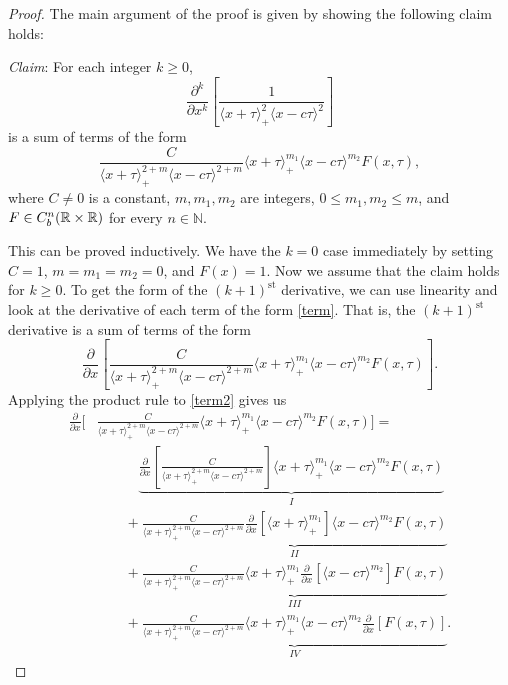 \cknormbound*
\begin{proof}
	The main argument of the proof is given by showing the following claim holds:
	
	\emph{Claim}: For each integer \(k\geq 0\), \[\frac{\partial^k}{\partial x^k} \left[\frac 1 {\langle x+\tau\rangle_+^2 \langle x -c\tau \rangle^2}\right]\] is a sum of terms of the form 
	\begin{equation}\label{term}
		\frac C {\langle x +\tau\rangle_+^{2+m} \langle x -c\tau \rangle^{2+m}}\langle x + \tau \rangle_+^{m_1}\langle x-c\tau\rangle^{m_2} F(x,\tau),
	\end{equation} where \(C\neq 0\) is a constant, \(m,m_1,m_2\) are integers, \(0\leq m_1, m_2 \leq m\), and \(F\in C^n_b(\mathbb{R}\times\mathbb{R})\) for every \(n\in \mathbb N\).
	
	This can be proved inductively. We have the \(k = 0\) case immediately by setting \(C = 1\), \(m=m_1=m_2 = 0\), and \(F(x) = 1\). Now we assume that the claim holds for \(k\geq 0\). To get the form of the \((k+1)^\text{st}\) derivative, we can use linearity and look at the derivative of each term of the form \cref{term}. That is, the \((k+1)^\text{st}\) derivative is a sum of terms of the form 
	\begin{equation}\label{term2}
		\frac{\partial}{\partial x}\left[\frac C {\langle x +\tau\rangle_+^{2+m} \langle x -c\tau \rangle^{2+m}}\langle x + \tau \rangle_+^{m_1}\langle x-c\tau\rangle^{m_2} F(x,\tau)\right].
	\end{equation}
	Applying the product rule to \cref{term2} gives us 
	\begin{align*}
		\frac{\partial}{\partial x}\Bigg[&\frac C {\langle x +\tau\rangle_+^{2+m} \langle x -c\tau \rangle^{2+m}} \langle x + \tau \rangle_+^{m_1}\langle x-c\tau\rangle^{m_2} F(x,\tau)\Bigg] = \\
		&\qquad\quad \underbrace{\frac{\partial}{\partial x}\left[\frac C {\langle x +\tau\rangle_+^{2+m} \langle x -c\tau \rangle^{2+m}}\right]\langle x + \tau \rangle_+^{m_1}\langle x-c\tau\rangle^{m_2} F(x,\tau)}_{I} \\
		&\qquad+ \underbrace{\frac C {\langle x +\tau\rangle_+^{2+m} \langle x -c\tau \rangle^{2+m}}\frac{\partial}{\partial x}\left[\langle x + \tau \rangle_+^{m_1}\right]\langle x-c\tau\rangle^{m_2} F(x,\tau)}_{II} \\
		&\qquad+ \underbrace{\frac C {\langle x +\tau\rangle_+^{2+m} \langle x -c\tau \rangle^{2+m}}\langle x + \tau \rangle_+^{m_1}\frac{\partial}{\partial x}\left[\langle x-c\tau\rangle^{m_2}\right] F(x,\tau)}_{III} \\
		&\qquad+ \underbrace{\frac C {\langle x +\tau\rangle_+^{2+m} \langle x -c\tau \rangle^{2+m}}\langle x + \tau \rangle_+^{m_1}\langle x-c\tau\rangle^{m_2} \frac{\partial}{\partial x}\left[F(x,\tau)\right] }_{IV}.
	\end{align*}
	

\end{proof}
